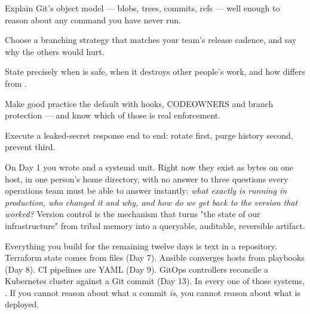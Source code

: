 
\begin{objectives}
\begin{wbitem}
  \item Explain Git's object model --- blobs, trees, commits, refs --- well enough to reason about any command you have never run.
  \item Choose a branching strategy that matches your team's release cadence, and say why the others would hurt.
  \item State precisely when  is safe, when it destroys other people's work, and how  differs from .
  \item Make good practice the default with hooks, CODEOWNERS and branch protection --- and know which of those is real enforcement.
  \item Execute a leaked-secret response end to end: rotate first, purge history second, prevent third.
\end{wbitem}
\end{objectives}


 On Day 1 you wrote  and a systemd unit. Right now they exist as bytes on one host, in one person's home directory, with no answer to three questions every operations team must be able to answer instantly: \emph{what exactly is running in production, who changed it and why, and how do we get back to the version that worked?} Version control is the mechanism that turns "the state of our infrastructure" from tribal memory into a queryable, auditable, reversible artifact.

 Everything you build for the remaining twelve days is text in a repository. Terraform state comes from  files (Day 7). Ansible converges hosts from playbooks (Day 8). CI pipelines are YAML (Day 9). GitOps controllers reconcile a Kubernetes cluster against a Git commit (Day 13). In every one of those systems, . If you cannot reason about what a commit \emph{is}, you cannot reason about what is deployed.

